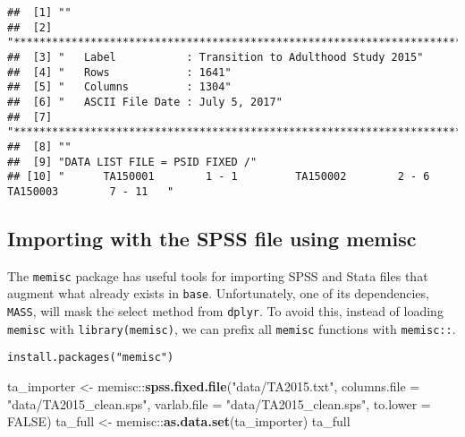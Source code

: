 \documentclass[]{book}
\newenvironment{Shaded}{\begin{snugshade}}{\end{snugshade}}
\newcommand{\KeywordTok}[1]{\textcolor[rgb]{0.13,0.29,0.53}{\textbf{{#1}}}}
\newcommand{\DataTypeTok}[1]{\textcolor[rgb]{0.13,0.29,0.53}{{#1}}}
\newcommand{\StringTok}[1]{\textcolor[rgb]{0.31,0.60,0.02}{{#1}}}
\newcommand{\OtherTok}[1]{\textcolor[rgb]{0.56,0.35,0.01}{{#1}}}
\newcommand{\NormalTok}[1]{{#1}}
\theoremstyle{definition}
\theoremstyle{definition}
\theoremstyle{remark}
\begin{document}
\begin{verbatim}
##  [1] ""                                                                                           
##  [2] "**************************************************************************"                 
##  [3] "   Label           : Transition to Adulthood Study 2015"                                    
##  [4] "   Rows            : 1641"                                                                  
##  [5] "   Columns         : 1304"                                                                  
##  [6] "   ASCII File Date : July 5, 2017"                                                          
##  [7] "*************************************************************************."                 
##  [8] ""                                                                                           
##  [9] "DATA LIST FILE = PSID FIXED /"                                                              
## [10] "      TA150001        1 - 1         TA150002        2 - 6         TA150003        7 - 11   "
\end{verbatim}

\subsection{Importing with the SPSS file using
memisc}\label{importing-with-the-spss-file-using-memisc}

The \texttt{memisc} package has useful tools for importing SPSS and
Stata files that augment what already exists in \texttt{base}.
Unfortunately, one of its dependencies, \texttt{MASS}, will mask the
select method from \texttt{dplyr}. To avoid this, instead of loading
\texttt{memisc} with \texttt{library(memisc)}, we can prefix all
\texttt{memisc} functions with \texttt{memisc::}.

\begin{verbatim}
install.packages("memisc")
\end{verbatim}

\begin{Shaded}
\begin{Highlighting}[]
\NormalTok{ta_importer <-}\StringTok{ }\NormalTok{memisc::}\KeywordTok{spss.fixed.file}\NormalTok{(}\StringTok{"data/TA2015.txt"}\NormalTok{, }\DataTypeTok{columns.file =} \StringTok{"data/TA2015_clean.sps"}\NormalTok{, }\DataTypeTok{varlab.file =} \StringTok{"data/TA2015_clean.sps"}\NormalTok{, }\DataTypeTok{to.lower =} \OtherTok{FALSE}\NormalTok{)}
\NormalTok{ta_full <-}\StringTok{ }\NormalTok{memisc::}\KeywordTok{as.data.set}\NormalTok{(ta_importer)}
\NormalTok{ta_full}
\end{Highlighting}
\end{Shaded}
\end{document}

